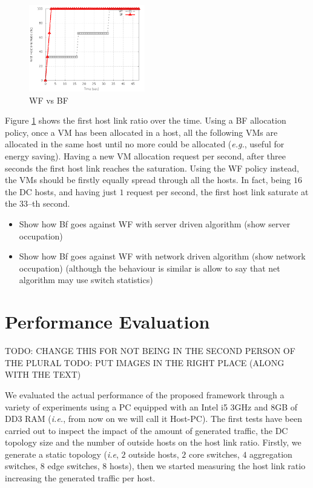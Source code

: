 \documentclass[12pt,english,oneside]{book}
\begin{document}
\begin{figure}[h!tbp]
        \centering
        \includegraphics[width=0.45\textwidth]{figures/use_case.png}
        \caption{WF vs BF}
        \label{fig:wf_bf}
\end{figure}

Figure \ref{fig:wf_bf} shows the first host link ratio over the time. Using a BF allocation policy, once a VM has been allocated in a host, all the following VMs are allocated in the same host until no more could be allocated (\textit{e.g.}, useful for energy saving). Having a new VM allocation request per second, after three seconds the first host link reaches the saturation. Using the WF policy instead, the VMs should be firstly equally spread through all the hosts. In fact, being $16$ the DC hosts, and having just $1$ request per second, the first host link saturate at the $33$--th second.


\begin{itemize}
	\item Show how Bf goes against WF with server driven algorithm (show server occupation)
	\item Show how Bf goes against WF with network driven algorithm (show network occupation) (although the behaviour is similar is allow to say that net algorithm may use switch statistics)
\end{itemize}
\newpage


\section{Performance Evaluation}
\label{sec:perf}
\hspace{0.6cm}

TODO: CHANGE THIS FOR NOT BEING IN THE SECOND PERSON OF THE PLURAL
TODO: PUT IMAGES IN THE RIGHT PLACE (ALONG WITH THE TEXT)

We evaluated the actual performance of the proposed framework through a variety of experiments using a PC equipped with an Intel i5 3GHz and 8GB of DD3 RAM (\textit{i.e.}, from now on we will call it Host-PC).
The first tests have been carried out to inspect the impact of the amount of generated traffic, the DC topology size and the number of outside hosts on the host link ratio.
Firstly, we generate a static topology (\textit{i.e}, $2$ outside hosts, $2$ core switches, $4$ aggregation switches, $8$ edge switches, $8$ hosts), then we started measuring the host link ratio increasing the generated traffic per host.
\end{document}
